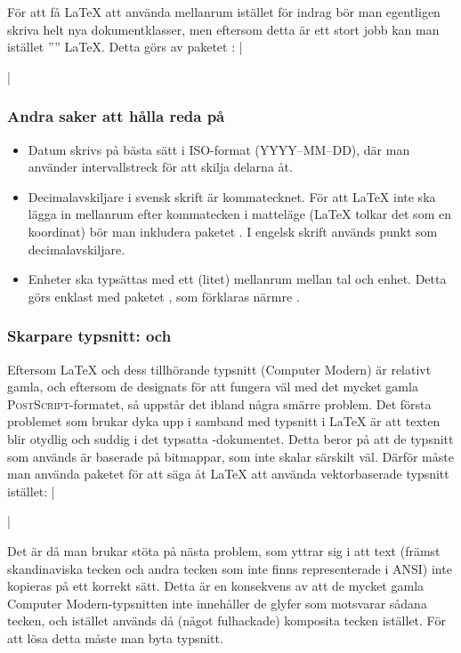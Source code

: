 \documentclass[../../latex.tex]{subfiles}
\begin{document}
För att få \LaTeX{} att använda mellanrum istället för indrag bör man
egentligen skriva helt nya dokumentklasser, men eftersom detta är ett
stort jobb kan man istället ”” \LaTeX{}. Detta görs av
paketet :
\latex|\usepackage{parskip}|

\subsubsection{Andra saker att hålla reda på}
\begin{itemize}
 \item Datum skrivs på bästa sätt i ISO-format (YYYY–MM–DD), där man
använder intervallstreck för att skilja delarna åt.
	
\item Decimalavskiljare i svensk skrift är kommatecknet. För att
	\LaTeX{} inte ska lägga in mellanrum efter kommatecken i matteläge
	(\LaTeX{} tolkar det som en koordinat) bör man inkludera paketet
	. I engelsk skrift används punkt som decimalavskiljare.
	
\item Enheter ska typsättas med ett (litet) mellanrum mellan tal och
	enhet. Detta görs enklast med paketet , som förklaras
	närmre .
\end{itemize}

\subsubsection{Skarpare typsnitt:  och }
\label{sec:2:lmodern}
Eftersom \LaTeX{} och dess tillhörande typsnitt (Computer Modern) är
relativt gamla, och eftersom de designats för att fungera väl med det
mycket gamla \textsc{PostScript}-formatet, så uppstår det ibland några
smärre problem. Det första problemet som brukar dyka upp i samband med
typsnitt i \LaTeX{} är att texten blir otydlig och suddig i det typsatta
\PDF-dokumentet. Detta beror på att de typsnitt som används är baserade
på bitmappar, som inte skalar särskilt väl. Därför måste man använda
paketet  för att säga åt \LaTeX{} att använda vektorbaserade
typsnitt istället:
\latex|\usepackage[T1]{fontenc}|

Det är då man brukar stöta på nästa problem, som yttrar sig i att text
(främst skandinaviska tecken och andra tecken som inte finns 
representerade i \textsc{ANSI}) inte kopieras på ett korrekt sätt. Detta
är en konsekvens av att de mycket gamla Computer Modern-typsnitten inte
innehåller de glyfer som motsvarar sådana tecken, och istället används då
(något fulhackade) komposita tecken istället. För att lösa detta måste man
byta typsnitt.
\end{document}
